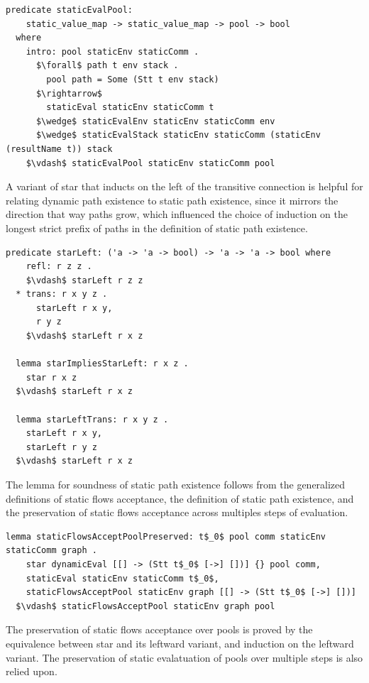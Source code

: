 \documentclass[letterpaper, 11pt]{extarticle}
\begin{document}
\begin{lstlisting}[language=logic, mathescape]
  predicate staticEvalPool:
    static_value_map -> static_value_map -> pool -> bool
  where
    intro: pool staticEnv staticComm .
      $\forall$ path t env stack .
        pool path = Some (Stt t env stack)
      $\rightarrow$ 
        staticEval staticEnv staticComm t
      $\wedge$ staticEvalEnv staticEnv staticComm env
      $\wedge$ staticEvalStack staticEnv staticComm (staticEnv (resultName t)) stack
    $\vdash$ staticEvalPool staticEnv staticComm pool
  \end{lstlisting}


A variant of star that inducts on the left of the transitive connection is helpful for
relating dynamic path existence to static path existence, since it mirrors the direction that way
paths grow, which influenced the choice of induction on the longest strict prefix of paths
in the definition of static path existence.

\begin{lstlisting}[language=logic, mathescape]
  predicate starLeft: ('a -> 'a -> bool) -> 'a -> 'a -> bool where
    refl: r z z .
    $\vdash$ starLeft r z z
  * trans: r x y z .
      starLeft r x y,
      r y z
    $\vdash$ starLeft r x z

  lemma starImpliesStarLeft: r x z .
    star r x z
  $\vdash$ starLeft r x z

  lemma starLeftTrans: r x y z .
    starLeft r x y,
    starLeft r y z 
  $\vdash$ starLeft r x z
\end{lstlisting}

The lemma for soundness of static path existence follows from the generalized definitions
of static flows acceptance, the definition of static path existence, and the preservation
of static flows acceptance across multiples steps of evaluation.

\begin{lstlisting}[language=logic, mathescape]
  lemma staticFlowsAcceptPoolPreserved: t$_0$ pool comm staticEnv staticComm graph .
    star dynamicEval [[] -> (Stt t$_0$ [->] [])] {} pool comm, 
    staticEval staticEnv staticComm t$_0$,
    staticFlowsAcceptPool staticEnv graph [[] -> (Stt t$_0$ [->] [])]
  $\vdash$ staticFlowsAcceptPool staticEnv graph pool 
\end{lstlisting}

The preservation of static flows acceptance over pools is proved by the
equivalence between star and its leftward variant, and induction on the leftward variant.
The preservation of static evalatuation of pools over multiple steps is also relied upon.
\end{document}
